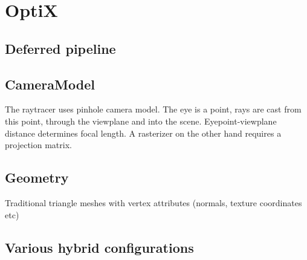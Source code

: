 \section{OptiX}

\subsection{Deferred pipeline}

\subsection{CameraModel}
The raytracer uses pinhole camera model. The eye is a point, rays are cast from this point, through the viewplane and into the scene. Eyepoint-viewplane distance determines focal length. A rasterizer on the other hand requires a projection matrix.

\subsection{Geometry}

Traditional triangle meshes with vertex attributes (normals, texture coordinates etc)

\subsection{Various hybrid configurations}


